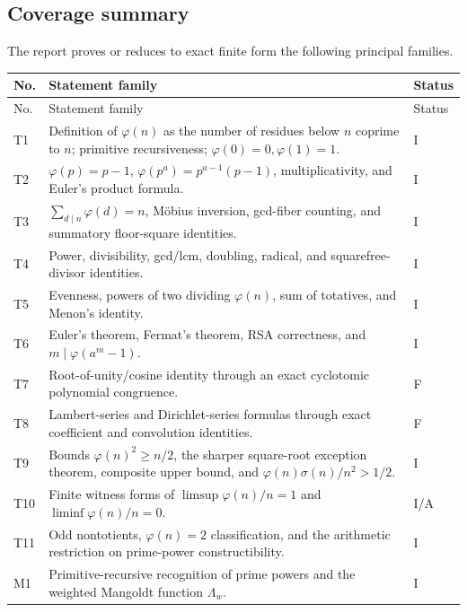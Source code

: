 \documentclass[11pt]{article}
\theoremstyle{definition}
\newcommand{\StatusI}{\textsf{I}}
\newcommand{\StatusF}{\textsf{F}}
\newcommand{\StatusA}{\textsf{A}}
\begin{document}
\subsection{Coverage summary}

The report proves or reduces to exact finite form the following principal
families.

\begin{longtable}{@{}p{}p{}p{}@{}}
\toprule
No. & Statement family & Status \\
\midrule
\endfirsthead
\toprule No. & Statement family & Status \\
\midrule
\endhead
T1 & Definition of \(\varphi(n)\) as the number of residues below \(n\) coprime to \(n\); primitive recursiveness; \(\varphi(0)=0,\varphi(1)=1\). & \StatusI\\
T2 & \(\varphi(p)=p-1\), \(\varphi(p^a)=p^{a-1}(p-1)\), multiplicativity, and Euler's product formula. & \StatusI\\
T3 & \(\sum_{d\mid n}\varphi(d)=n\), M\"obius inversion, gcd-fiber counting, and summatory floor-square identities. & \StatusI\\
T4 & Power, divisibility, gcd/lcm, doubling, radical, and squarefree-divisor identities. & \StatusI\\
T5 & Evenness, powers of two dividing \(\varphi(n)\), sum of totatives, and Menon's identity. & \StatusI\\
T6 & Euler's theorem, Fermat's theorem, RSA correctness, and \(m\mid\varphi(a^m-1)\). & \StatusI\\
T7 & Root-of-unity/cosine identity through an exact cyclotomic polynomial congruence. & \StatusF\\
T8 & Lambert-series and Dirichlet-series formulas through exact coefficient and convolution identities. & \StatusF\\
T9 & Bounds \(\varphi(n)^2\ge n/2\), the sharper square-root exception theorem, composite upper bound, and \(\varphi(n)\sigma(n)/n^2>1/2\). & \StatusI\\
T10 & Finite witness forms of \(\limsup\varphi(n)/n=1\) and \(\liminf\varphi(n)/n=0\). & \StatusI/\StatusA\\
T11 & Odd nontotients, \(\varphi(n)=2\) classification, and the arithmetic restriction on prime-power constructibility. & \StatusI\\
M1 & Primitive-recursive recognition of prime powers and the weighted Mangoldt function \(\Lambda_w\). & \StatusI\\

\end{longtable}
\end{document}
